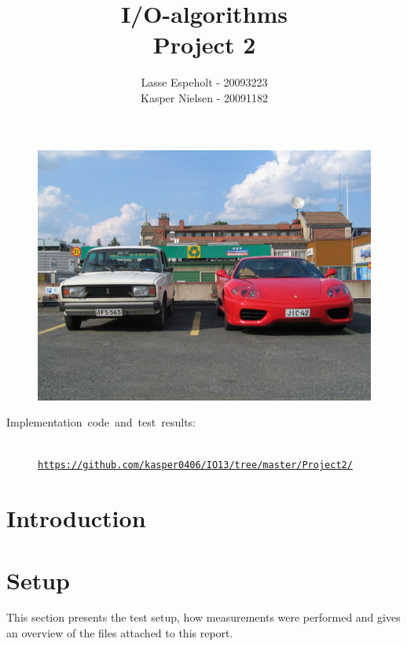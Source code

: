 \documentclass[a4paper,12pt]{article}
\begin{document}
\title{I/O-algorithms\\Project 2}

\author{Lasse Espeholt - 20093223\\
Kasper Nielsen - 20091182\\}

\maketitle
\begin{figure}[h!]
\includegraphics[width=\textwidth]{"images/forside"}
\end{figure}

\vfill{}
\begin{description}
\item [{Implementation~code~and~test~results:}]~
\\
\texttt{\url{https://github.com/kasper0406/IO13/tree/master/Project2/}}
\end{description}
\pagebreak{}\tableofcontents{}\pagebreak{}

\section{Introduction}


\section{Setup}
This section presents the test setup, how measurements were performed
and gives an overview of the files attached to this report.
\end{document}

